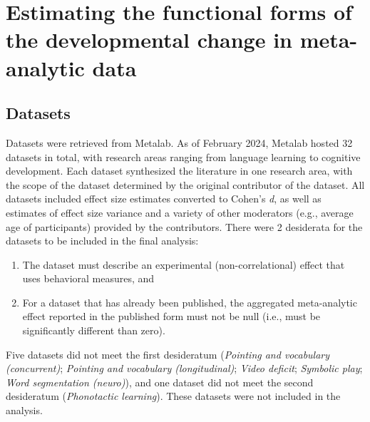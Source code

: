 \documentclass[
  man]{apa6}
\providecommand{\tightlist}{%
  \setlength{\itemsep}{0pt}\setlength{\parskip}{0pt}}
\begin{document}
\hypertarget{estimating-the-functional-forms-of-the-developmental-change-in-meta-analytic-data}{%
\section{Estimating the functional forms of the developmental change in meta-analytic data}\label{estimating-the-functional-forms-of-the-developmental-change-in-meta-analytic-data}}

\hypertarget{datasets}{%
\subsection{Datasets}\label{datasets}}

Datasets were retrieved from Metalab. As of February 2024, Metalab hosted 32 datasets in total, with research areas ranging from language learning to cognitive development. Each dataset synthesized the literature in one research area, with the scope of the dataset determined by the original contributor of the dataset. All datasets included effect size estimates converted to Cohen's \emph{d}, as well as estimates of effect size variance and a variety of other moderators (e.g., average age of participants) provided by the contributors. There were 2 desiderata for the datasets to be included in the final analysis:

\begin{enumerate}
\def\labelenumi{\arabic{enumi}.}
\tightlist
\item
  The dataset must describe an experimental (non-correlational) effect that uses behavioral measures, and
\item
  For a dataset that has already been published, the aggregated meta-analytic effect reported in the published form must not be null (i.e., must be significantly different than zero).
\end{enumerate}

Five datasets did not meet the first desideratum (\emph{Pointing and vocabulary (concurrent)}; \emph{Pointing and vocabulary (longitudinal)}; \emph{Video deficit}; \emph{Symbolic play}; \emph{Word segmentation (neuro)}), and one dataset did not meet the second desideratum (\emph{Phonotactic learning}). These datasets were not included in the analysis.
\end{document}
